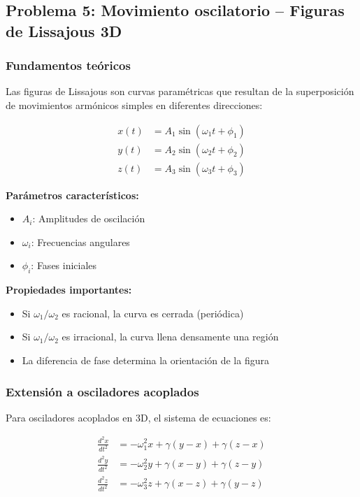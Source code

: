 \documentclass{article}
\begin{document}
	\clearpage

	\subsection{Problema 5: Movimiento oscilatorio -- Figuras de Lissajous 3D}
	
	\subsubsection{Fundamentos teóricos}
	
	Las figuras de Lissajous son curvas paramétricas que resultan de la superposición de movimientos armónicos simples en diferentes direcciones:
	
	\begin{align}
		x(t) &= A_1 \sin(\omega_1 t + \phi_1) \\
		y(t) &= A_2 \sin(\omega_2 t + \phi_2) \\
		z(t) &= A_3 \sin(\omega_3 t + \phi_3)
	\end{align}
	
	\textbf{Parámetros característicos:}
	\begin{itemize}
	\item $A_i$: Amplitudes de oscilación
	\item $\omega_i$: Frecuencias angulares
	\item $\phi_i$: Fases iniciales
	\end{itemize}
	
	\textbf{Propiedades importantes:}
	\begin{itemize}
	\item Si $\omega_1/\omega_2$ es racional, la curva es cerrada (periódica)
	\item Si $\omega_1/\omega_2$ es irracional, la curva llena densamente una región
	\item La diferencia de fase determina la orientación de la figura
	\end{itemize}

	\subsubsection{Extensión a osciladores acoplados}
	
	Para osciladores acoplados en 3D, el sistema de ecuaciones es:
	
	\begin{align}
		\frac{d^2x}{dt^2} &= -\omega_1^2 x + \gamma(y - x) + \gamma(z - x) \\
		\frac{d^2y}{dt^2} &= -\omega_2^2 y + \gamma(x - y) + \gamma(z - y) \\
		\frac{d^2z}{dt^2} &= -\omega_3^2 z + \gamma(x - z) + \gamma(y - z)
	\end{align}
	
\end{document}
